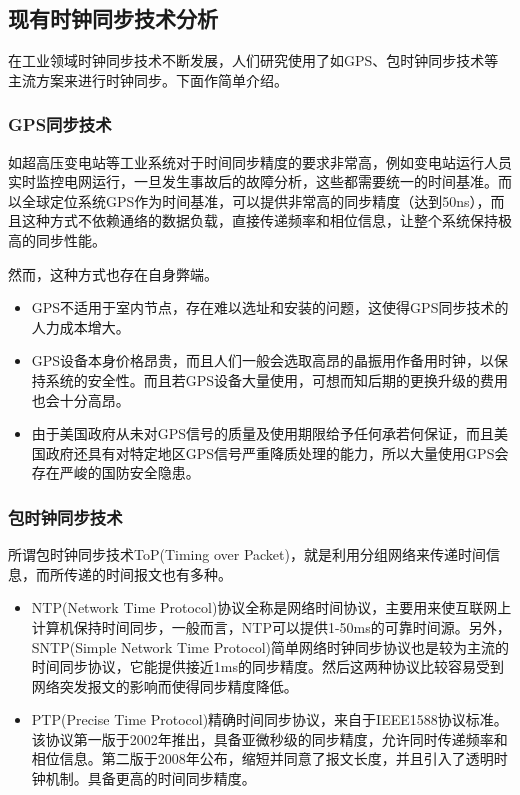 \subsection{现有时钟同步技术分析}
\label{sec:sync_methods}
在工业领域时钟同步技术不断发展，人们研究使用了如GPS、包时钟同步技术等主流方案来进行时钟同步。下面作简单介绍。
\subsubsection{GPS同步技术}
如超高压变电站等工业系统对于时间同步精度的要求非常高，例如变电站运行人员实时监控电网运行，一旦发生事故后的故障分析，这些都需要统一的时间基准。而以全球定位系统GPS作为时间基准，可以提供非常高的同步精度（达到50ns），而且这种方式不依赖通络的数据负载，直接传递频率和相位信息，让整个系统保持极高的同步性能。

然而，这种方式也存在自身弊端。
\begin{itemize}[noitemsep,topsep=0pt,parsep=0pt,partopsep=0pt]
	\item GPS不适用于室内节点，存在难以选址和安装的问题，这使得GPS同步技术的人力成本增大。
	\item GPS设备本身价格昂贵，而且人们一般会选取高昂的晶振用作备用时钟，以保持系统的安全性。而且若GPS设备大量使用，可想而知后期的更换升级的费用也会十分高昂。
	\item 由于美国政府从未对GPS信号的质量及使用期限给予任何承若何保证，而且美国政府还具有对特定地区GPS信号严重降质处理的能力，所以大量使用GPS会存在严峻的国防安全隐患。
\end{itemize}

\subsubsection{包时钟同步技术}
所谓包时钟同步技术ToP(Timing over Packet)，就是利用分组网络来传递时间信息，而所传递的时间报文也有多种。
\begin{itemize}[noitemsep,topsep=0pt,parsep=0pt,partopsep=0pt]
	\item  NTP(Network Time Protocol)协议全称是网络时间协议，主要用来使互联网上计算机保持时间同步，一般而言，NTP可以提供1-50ms的可靠时间源。另外，SNTP(Simple Network Time Protocol)简单网络时钟同步协议也是较为主流的时间同步协议，它能提供接近1ms的同步精度。然后这两种协议比较容易受到网络突发报文的影响而使得同步精度降低。
	\item PTP(Precise Time Protocol)精确时间同步协议，来自于IEEE1588协议标准。该协议第一版于2002年推出，具备亚微秒级的同步精度，允许同时传递频率和相位信息。第二版于2008年公布，缩短并同意了报文长度，并且引入了透明时钟机制。具备更高的时间同步精度。
\end{itemize}


